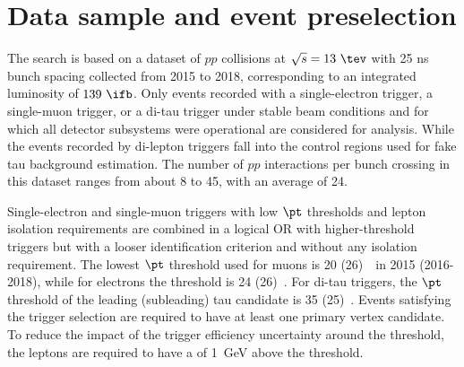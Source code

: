 \section{Data sample and event preselection}
\label{sec:data_presel}

The search is based on a dataset of $pp$ collisions at $\sqrt{s}=13~\tev$ with 25 ns bunch spacing collected from 2015 to 2018, corresponding to an integrated luminosity of $139~\ifb$.
Only events recorded with a single-electron trigger, a single-muon trigger, or a di-tau trigger under stable beam conditions 
and for which all detector subsystems were operational are considered for analysis. While the events recorded by di-lepton triggers fall into the control regions used for fake tau background estimation.
The number of $pp$ interactions per bunch crossing in this dataset ranges from about 8 to 45, with an average of 24.

Single-electron and single-muon triggers with low $\pt$ thresholds and lepton isolation requirements are combined in a logical OR 
with higher-threshold triggers but with a looser identification criterion and without any isolation requirement.
The lowest $\pt$ threshold used for muons is 20 (26)~\gev\ in 2015 (2016-2018), while for electrons the threshold is 24 (26)~\gev.
For di-tau triggers, the $\pt$ threshold of the leading (subleading) tau candidate is 35 (25)~\gev.
Events satisfying the trigger selection are required to have at least one primary vertex candidate.
To reduce the impact of the trigger efficiency uncertainty around the threshold, the leptons are required to have a \pt of 1~GeV above the threshold. 

